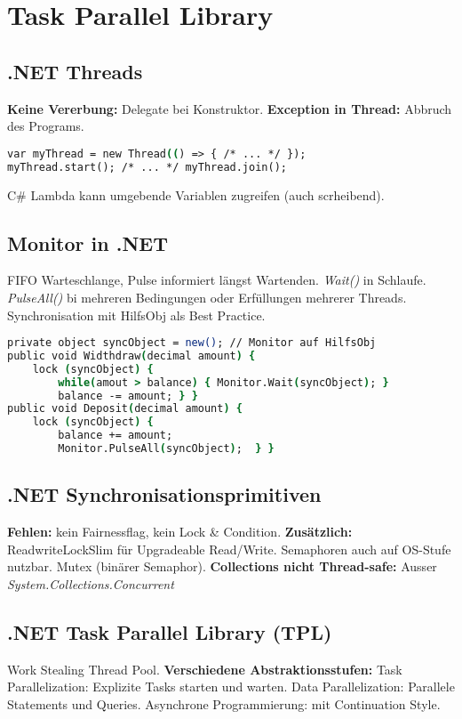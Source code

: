 \section{Task Parallel Library}
\subsection{.NET Threads}
\textbf{Keine Vererbung:} Delegate bei Konstruktor.
\textbf{Exception in Thread:} Abbruch des Programs.
\begin{lstlisting}[language=csh]
var myThread = new Thread(() => { /* ... */ });
myThread.start(); /* ... */ myThread.join();
\end{lstlisting}
C\# Lambda kann umgebende Variablen zugreifen (auch scrheibend).

\subsection{Monitor in .NET}
FIFO Warteschlange, Pulse informiert längst Wartenden. \textit{Wait()} in Schlaufe.
\textit{PulseAll()} bi mehreren Bedingungen oder Erfüllungen mehrerer Threads.
Synchronisation mit HilfsObj als Best Practice.
\begin{lstlisting}[language=csh]
private object syncObject = new(); // Monitor auf HilfsObj
public void Widthdraw(decimal amount) {
    lock (syncObject) {
        while(amout > balance) { Monitor.Wait(syncObject); }
        balance -= amount; } }
public void Deposit(decimal amount) {
    lock (syncObject) {
        balance += amount;
        Monitor.PulseAll(syncObject);  } }
\end{lstlisting}

\subsection{.NET Synchronisationsprimitiven}
\textbf{Fehlen:} kein Fairnessflag, kein Lock \& Condition.
\textbf{Zusätzlich:} ReadwriteLockSlim für Upgradeable Read/Write. Semaphoren auch auf OS-Stufe nutzbar.
Mutex (binärer Semaphor).
\textbf{Collections nicht Thread-safe:} Ausser \textit{System.Collections.Concurrent}

\subsection{.NET Task Parallel Library (TPL)}
Work Stealing Thread Pool. 
\textbf{Verschiedene Abstraktionsstufen:} Task Parallelization: Explizite Tasks starten und warten.
Data Parallelization: Parallele Statements und Queries.
Asynchrone Programmierung: mit Continuation Style.


